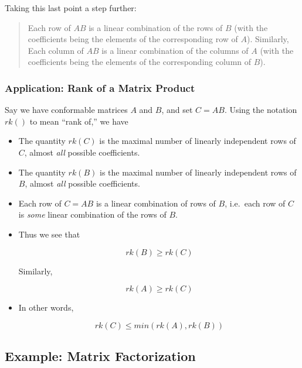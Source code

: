 Taking this last point a step further:

\begin{quote}
Each row of $AB$ is a linear combination of the rows of $B$ (with the
coefficients being the elements of the corresponding row of $A$).
Similarly,
Each column of $AB$ is a linear combination of the columns of $A$ (with the
coefficients being the elements of the corresponding column of $B$).
\end{quote}

\subsubsection{Application:  Rank of a Matrix Product}

Say we have conformable matrices $A$ and $B$, and set $C = AB$.  Using
the notation $rk()$ to mean ``rank of,'' we have

\begin{itemize}

\item The quantity $rk(C)$ is the maximal number of linearly independent
rows of $C$, almost \textit{all} possible coefficients.

\item The quantity $rk(B)$ is the maximal number of linearly independent
rows of $B$, almost \textit{all} possible coefficients.

\item Each row of $C = AB$ is a linear combination of rows of $B$,
i.e.\ each row of $C$ is \textit{some} linear combination of the rows of
$B$.

\item Thus we see that 

\begin{equation}
rk(B) \geq rk(C)
\end{equation}

Similarly,

\begin{equation}
rk(A) \geq rk(C)
\end{equation}

\item In other words,

\begin{equation}
rk(C) \leq min(rk(A),rk(B))
\end{equation}

\end{itemize} 

\subsection{Example:  Matrix Factorization}
\label{mfact}

